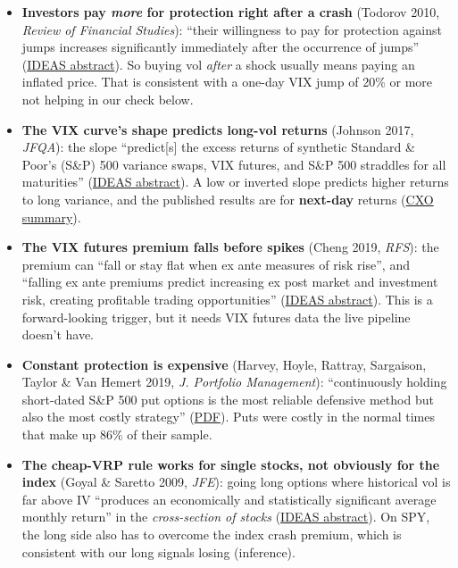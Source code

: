 \documentclass{article}
\begin{document}
\begin{itemize}

\item \textbf{Investors pay \emph{more} for protection right after a crash} (Todorov 2010, \emph{Review of Financial Studies}): ``their willingness to pay for protection against jumps increases significantly immediately after the occurrence of jumps'' (\href{https://ideas.repec.org/a/oup/rfinst/v23y2010i1p345-383.html}{IDEAS abstract}). So buying vol \emph{after} a shock usually means paying an inflated price. That is consistent with a one-day VIX jump of 20\% or more not helping in our check below.

\item \textbf{The VIX curve's shape predicts long-vol returns} (Johnson 2017, \emph{JFQA}): the slope ``predict[s] the excess returns of synthetic Standard \& Poor's (S\&P) 500 variance swaps, VIX futures, and S\&P 500 straddles for all maturities'' (\href{https://ideas.repec.org/a/cup/jfinqa/v52y2017i06p2461-2490_00.html}{IDEAS abstract}). A low or inverted slope predicts higher returns to long variance, and the published results are for \textbf{next-day} returns (\href{https://www.cxoadvisory.com/volatility-effects/vix-term-structure-slope-and-variance-asset-future-returns/}{CXO summary}).

\item \textbf{The VIX futures premium falls before spikes} (Cheng 2019, \emph{RFS}): the premium can ``fall or stay flat when ex ante measures of risk rise'', and ``falling ex ante premiums predict increasing ex post market and investment risk, creating profitable trading opportunities'' (\href{https://ideas.repec.org/a/oup/rfinst/v32y2019i1p180-227..html}{IDEAS abstract}). This is a forward-looking trigger, but it needs VIX futures data the live pipeline doesn't have.

\item \textbf{Constant protection is expensive} (Harvey, Hoyle, Rattray, Sargaison, Taylor \& Van Hemert 2019, \emph{J. Portfolio Management}): ``continuously holding short-dated S\&P 500 put options is the most reliable defensive method but also the most costly strategy'' (\href{https://people.duke.edu/~charvey/Research/Published_Papers/P140_The_best_of.pdf}{PDF}). Puts were costly in the normal times that make up 86\% of their sample.

\item \textbf{The cheap-VRP rule works for single stocks, not obviously for the index} (Goyal \& Saretto 2009, \emph{JFE}): going long options where historical vol is far above IV ``produces an economically and statistically significant average monthly return'' in the \emph{cross-section of stocks} (\href{https://ideas.repec.org/a/eee/jfinec/v94y2009i2p310-326.html}{IDEAS abstract}). On SPY, the long side also has to overcome the index crash premium, which is consistent with our long signals losing (inference).

\end{itemize}
\end{document}
